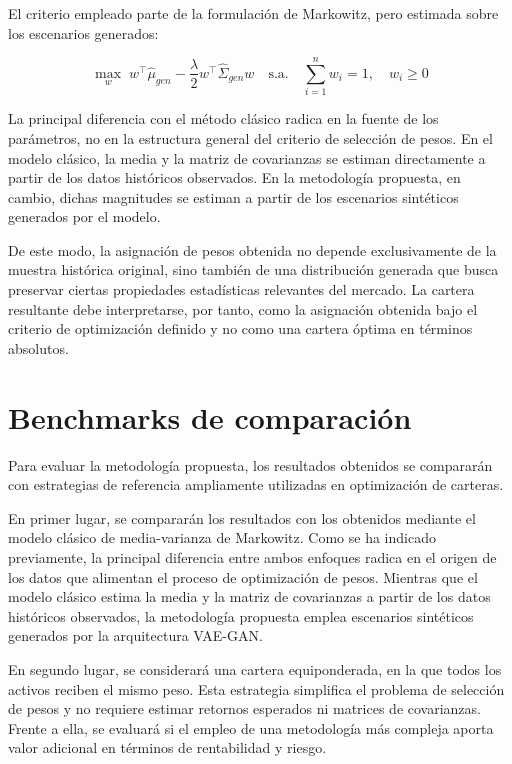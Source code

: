 El criterio empleado parte de la formulación de Markowitz, pero estimada sobre los escenarios generados:

\begin{equation}
\max_{w}
\; w^{\top}\hat{\mu}_{gen}
-
\frac{\lambda}{2}
w^{\top}\hat{\Sigma}_{gen}w
\quad
\text{s.a.}
\quad
\sum_{i=1}^{n} w_i = 1,
\quad
w_i \geq 0
\end{equation}

La principal diferencia con el método clásico radica en la fuente de los parámetros, no en la estructura general del criterio de selección de pesos. En el modelo clásico, la media y la matriz de covarianzas se estiman directamente a partir de los datos históricos observados. En la metodología propuesta, en cambio, dichas magnitudes se estiman a partir de los escenarios sintéticos generados por el modelo.

De este modo, la asignación de pesos obtenida no depende exclusivamente de la muestra histórica original, sino también de una distribución generada que busca preservar ciertas propiedades estadísticas relevantes del mercado. La cartera resultante debe interpretarse, por tanto, como la asignación obtenida bajo el criterio de optimización definido y no como una cartera óptima en términos absolutos.

\section{Benchmarks de comparación}

Para evaluar la metodología propuesta, los resultados obtenidos se compararán con estrategias de referencia ampliamente utilizadas en optimización de carteras.

En primer lugar, se compararán los resultados con los obtenidos mediante el modelo clásico de media-varianza de Markowitz. Como se ha indicado previamente, la principal diferencia entre ambos enfoques radica en el origen de los datos que alimentan el proceso de optimización de pesos. Mientras que el modelo clásico estima la media y la matriz de covarianzas a partir de los datos históricos observados, la metodología propuesta emplea escenarios sintéticos generados por la arquitectura VAE-GAN.

En segundo lugar, se considerará una cartera equiponderada, en la que todos los activos reciben el mismo peso. Esta estrategia simplifica el problema de selección de pesos y no requiere estimar retornos esperados ni matrices de covarianzas. Frente a ella, se evaluará si el empleo de una metodología más compleja aporta valor adicional en términos de rentabilidad y riesgo.

